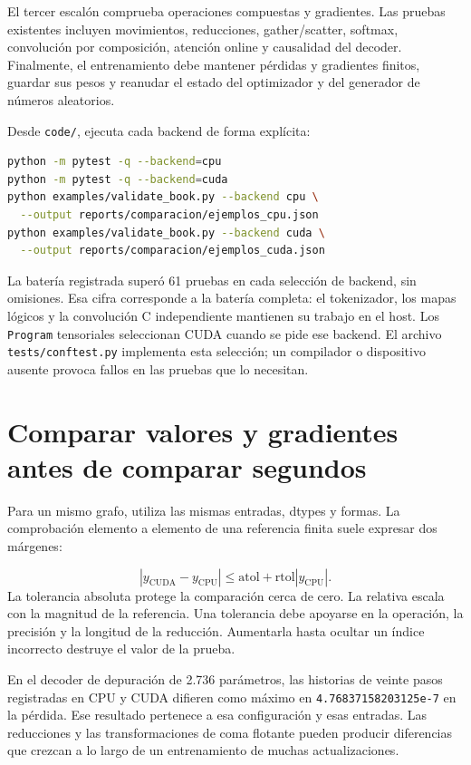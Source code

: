 \documentclass[12pt,a4paper,oneside]{report}
\begin{document}
El tercer escalón comprueba operaciones compuestas y gradientes. Las pruebas existentes incluyen movimientos, reducciones, gather/scatter, softmax, convolución por composición, atención online y causalidad del decoder. Finalmente, el entrenamiento debe mantener pérdidas y gradientes finitos, guardar sus pesos y reanudar el estado del optimizador y del generador de números aleatorios.

Desde \texttt{code/}, ejecuta cada backend de forma explícita:

\begin{lstlisting}[language=bash]
python -m pytest -q --backend=cpu
python -m pytest -q --backend=cuda
python examples/validate_book.py --backend cpu \
  --output reports/comparacion/ejemplos_cpu.json
python examples/validate_book.py --backend cuda \
  --output reports/comparacion/ejemplos_cuda.json
\end{lstlisting}
La batería registrada superó 61 pruebas en cada selección de backend, sin omisiones. Esa cifra corresponde a la batería completa: el tokenizador, los mapas lógicos y la convolución C independiente mantienen su trabajo en el host. Los \texttt{Program} tensoriales seleccionan CUDA cuando se pide ese backend. El archivo \texttt{tests/conftest.py} implementa esta selección; un compilador o dispositivo ausente provoca fallos en las pruebas que lo necesitan.

\section{Comparar valores y gradientes antes de comparar segundos}
Para un mismo grafo, utiliza las mismas entradas, dtypes y formas. La comprobación elemento a elemento de una referencia finita suele expresar dos márgenes:

\[
|y_{\mathrm{CUDA}}-y_{\mathrm{CPU}}|
\leq \mathrm{atol}+\mathrm{rtol}|y_{\mathrm{CPU}}|.
\]
La tolerancia absoluta protege la comparación cerca de cero. La relativa escala con la magnitud de la referencia. Una tolerancia debe apoyarse en la operación, la precisión y la longitud de la reducción. Aumentarla hasta ocultar un índice incorrecto destruye el valor de la prueba.

En el decoder de depuración de 2.736 parámetros, las historias de veinte pasos registradas en CPU y CUDA difieren como máximo en \texttt{4.76837158203125e-7} en la pérdida. Ese resultado pertenece a esa configuración y esas entradas. Las reducciones y las transformaciones de coma flotante pueden producir diferencias que crezcan a lo largo de un entrenamiento de muchas actualizaciones.
\end{document}
